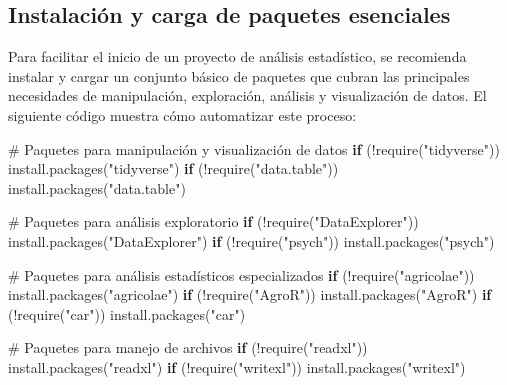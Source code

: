 \documentclass[
  spanish,
  a4paper,
  DIV=11,
  numbers=noendperiod,
  onepage,
  openany]{scrreprt}
\newenvironment{Shaded}{\begin{snugshade}}{\end{snugshade}}
\newcommand{\CommentTok}[1]{\textcolor[rgb]{0.37,0.37,0.37}{#1}}
\newcommand{\ControlFlowTok}[1]{\textcolor[rgb]{0.00,0.23,0.31}{\textbf{#1}}}
\newcommand{\FunctionTok}[1]{\textcolor[rgb]{0.28,0.35,0.67}{#1}}
\newcommand{\NormalTok}[1]{\textcolor[rgb]{0.00,0.23,0.31}{#1}}
\newcommand{\SpecialCharTok}[1]{\textcolor[rgb]{0.37,0.37,0.37}{#1}}
\newcommand{\StringTok}[1]{\textcolor[rgb]{0.13,0.47,0.30}{#1}}
\begin{document}
\subsection{Instalación y carga de paquetes
esenciales}\label{instalaciuxf3n-y-carga-de-paquetes-esenciales}

Para facilitar el inicio de un proyecto de análisis estadístico, se
recomienda instalar y cargar un conjunto básico de paquetes que cubran
las principales necesidades de manipulación, exploración, análisis y
visualización de datos. El siguiente código muestra cómo automatizar
este proceso:

\begin{Shaded}
\begin{Highlighting}[]
\CommentTok{\# Paquetes para manipulación y visualización de datos}
\ControlFlowTok{if}\NormalTok{ (}\SpecialCharTok{!}\FunctionTok{require}\NormalTok{(}\StringTok{"tidyverse"}\NormalTok{)) }\FunctionTok{install.packages}\NormalTok{(}\StringTok{"tidyverse"}\NormalTok{)}
\ControlFlowTok{if}\NormalTok{ (}\SpecialCharTok{!}\FunctionTok{require}\NormalTok{(}\StringTok{"data.table"}\NormalTok{)) }\FunctionTok{install.packages}\NormalTok{(}\StringTok{"data.table"}\NormalTok{)}

\CommentTok{\# Paquetes para análisis exploratorio}
\ControlFlowTok{if}\NormalTok{ (}\SpecialCharTok{!}\FunctionTok{require}\NormalTok{(}\StringTok{"DataExplorer"}\NormalTok{)) }\FunctionTok{install.packages}\NormalTok{(}\StringTok{"DataExplorer"}\NormalTok{)}
\ControlFlowTok{if}\NormalTok{ (}\SpecialCharTok{!}\FunctionTok{require}\NormalTok{(}\StringTok{"psych"}\NormalTok{)) }\FunctionTok{install.packages}\NormalTok{(}\StringTok{"psych"}\NormalTok{)}

\CommentTok{\# Paquetes para análisis estadísticos especializados}
\ControlFlowTok{if}\NormalTok{ (}\SpecialCharTok{!}\FunctionTok{require}\NormalTok{(}\StringTok{"agricolae"}\NormalTok{)) }\FunctionTok{install.packages}\NormalTok{(}\StringTok{"agricolae"}\NormalTok{)}
\ControlFlowTok{if}\NormalTok{ (}\SpecialCharTok{!}\FunctionTok{require}\NormalTok{(}\StringTok{"AgroR"}\NormalTok{)) }\FunctionTok{install.packages}\NormalTok{(}\StringTok{"AgroR"}\NormalTok{)}
\ControlFlowTok{if}\NormalTok{ (}\SpecialCharTok{!}\FunctionTok{require}\NormalTok{(}\StringTok{"car"}\NormalTok{)) }\FunctionTok{install.packages}\NormalTok{(}\StringTok{"car"}\NormalTok{)}

\CommentTok{\# Paquetes para manejo de archivos}
\ControlFlowTok{if}\NormalTok{ (}\SpecialCharTok{!}\FunctionTok{require}\NormalTok{(}\StringTok{"readxl"}\NormalTok{)) }\FunctionTok{install.packages}\NormalTok{(}\StringTok{"readxl"}\NormalTok{)}
\ControlFlowTok{if}\NormalTok{ (}\SpecialCharTok{!}\FunctionTok{require}\NormalTok{(}\StringTok{"writexl"}\NormalTok{)) }\FunctionTok{install.packages}\NormalTok{(}\StringTok{"writexl"}\NormalTok{)}
\end{Highlighting}
\end{Shaded}
\end{document}
